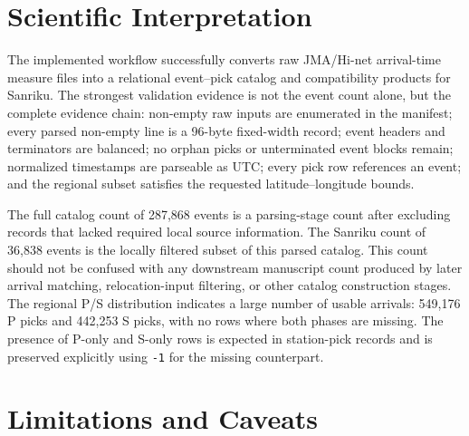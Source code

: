 \documentclass[11pt]{article}
\begin{document}
\section{Scientific Interpretation}

The implemented workflow successfully converts raw JMA/Hi-net arrival-time measure files into a relational event--pick catalog and compatibility products for Sanriku.  The strongest validation evidence is not the event count alone, but the complete evidence chain: non-empty raw inputs are enumerated in the manifest; every parsed non-empty line is a 96-byte fixed-width record; event headers and terminators are balanced; no orphan picks or unterminated event blocks remain; normalized timestamps are parseable as UTC; every pick row references an event; and the regional subset satisfies the requested latitude--longitude bounds.

The full catalog count of 287,868 events is a parsing-stage count after excluding records that lacked required local source information.  The Sanriku count of 36,838 events is the locally filtered subset of this parsed catalog.  This count should not be confused with any downstream manuscript count produced by later arrival matching, relocation-input filtering, or other catalog construction stages.  The regional P/S distribution indicates a large number of usable arrivals: 549,176 P picks and 442,253 S picks, with no rows where both phases are missing.  The presence of P-only and S-only rows is expected in station-pick records and is preserved explicitly using \texttt{-1} for the missing counterpart.

\section{Limitations and Caveats}
\end{document}
